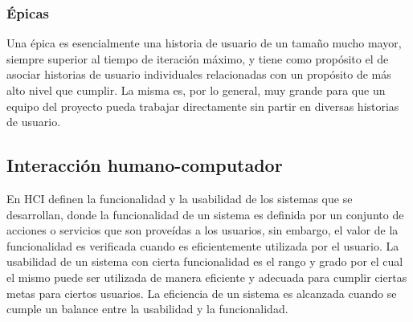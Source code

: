 


\subsubsection{Épicas}
Una épica es esencialmente una historia de usuario de un tamaño mucho mayor, siempre superior al tiempo de iteración máximo, y tiene como propósito el de asociar historias de usuario individuales relacionadas con un propósito de más alto nivel que cumplir. La misma es, por lo general, muy grande para que un equipo del proyecto pueda trabajar directamente sin partir en diversas historias de usuario\citep{cobb2015project}.


\subsection{Interacción humano-computador}
En HCI definen la funcionalidad y la usabilidad de los sistemas que se desarrollan, donde la funcionalidad de un sistema es definida por un conjunto de acciones o servicios que son proveídas a los usuarios, sin embargo, el valor de la funcionalidad es verificada cuando es eficientemente utilizada por el usuario\citep{shneiderman_designing_2010}. La usabilidad de un sistema con cierta funcionalidad es el rango y grado por el cual el mismo puede ser utilizada de manera eficiente y adecuada para cumplir ciertas metas para ciertos usuarios. La eficiencia de un sistema es alcanzada cuando se cumple un balance entre la usabilidad y la funcionalidad\citep{nielsen_usability_2010}.

